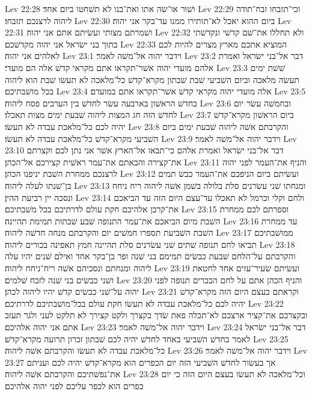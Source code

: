 Lev 22:28  ושׁור או־שׂה אתו ואת־בנו לא תשׁחטו ביום אחד׃
Lev 22:29  וכי־תזבחו זבח־תודה ליהוה לרצנכם תזבחו׃
Lev 22:30  ביום ההוא יאכל לא־תותירו ממנו עד־בקר אני יהוה׃
Lev 22:31  ושׁמרתם מצותי ועשׂיתם אתם אני יהוה׃
Lev 22:32  ולא תחללו את־שׁם קדשׁי ונקדשׁתי בתוך בני ישׂראל אני יהוה מקדשׁכם׃
Lev 22:33  המוציא אתכם מארץ מצרים להיות לכם לאלהים אני יהוה׃
Lev 23:1  וידבר יהוה אל־משׁה לאמר׃
Lev 23:2  דבר אל־בני ישׂראל ואמרת אלהם מועדי יהוה אשׁר־תקראו אתם מקראי קדשׁ אלה הם מועדי׃
Lev 23:3  שׁשׁת ימים תעשׂה מלאכה וביום השׁביעי שׁבת שׁבתון מקרא־קדשׁ כל־מלאכה לא תעשׂו שׁבת הוא ליהוה בכל מושׁבתיכם׃
Lev 23:4  אלה מועדי יהוה מקראי קדשׁ אשׁר־תקראו אתם במועדם׃
Lev 23:5  בחדשׁ הראשׁון בארבעה עשׂר לחדשׁ בין הערבים פסח ליהוה׃
Lev 23:6  ובחמשׁה עשׂר יום לחדשׁ הזה חג המצות ליהוה שׁבעת ימים מצות תאכלו׃
Lev 23:7  ביום הראשׁון מקרא־קדשׁ יהיה לכם כל־מלאכת עבדה לא תעשׂו׃
Lev 23:8  והקרבתם אשׁה ליהוה שׁבעת ימים ביום השׁביעי מקרא־קדשׁ כל־מלאכת עבדה לא תעשׂו׃
Lev 23:9  וידבר יהוה אל־משׁה לאמר׃
Lev 23:10  דבר אל־בני ישׂראל ואמרת אלהם כי־תבאו אל־הארץ אשׁר אני נתן לכם וקצרתם את־קצירה והבאתם את־עמר ראשׁית קצירכם אל־הכהן׃
Lev 23:11  והניף את־העמר לפני יהוה לרצנכם ממחרת השׁבת יניפנו הכהן׃
Lev 23:12  ועשׂיתם ביום הניפכם את־העמר כבשׂ תמים בן־שׁנתו לעלה ליהוה׃
Lev 23:13  ומנחתו שׁני עשׂרנים סלת בלולה בשׁמן אשׁה ליהוה ריח ניחח ונסכה יין רביעת ההין׃
Lev 23:14  ולחם וקלי וכרמל לא תאכלו עד־עצם היום הזה עד הביאכם את־קרבן אלהיכם חקת עולם לדרתיכם בכל משׁבתיכם׃
Lev 23:15  וספרתם לכם ממחרת השׁבת מיום הביאכם את־עמר התנופה שׁבע שׁבתות תמימת תהיינה׃
Lev 23:16  עד ממחרת השׁבת השׁביעת תספרו חמשׁים יום והקרבתם מנחה חדשׁה ליהוה׃
Lev 23:17  ממושׁבתיכם תביאו לחם תנופה שׁתים שׁני עשׂרנים סלת תהיינה חמץ תאפינה בכורים ליהוה׃
Lev 23:18  והקרבתם על־הלחם שׁבעת כבשׂים תמימם בני שׁנה ופר בן־בקר אחד ואילם שׁנים יהיו עלה ליהוה ומנחתם ונסכיהם אשׁה ריח־ניחח ליהוה׃
Lev 23:19  ועשׂיתם שׂעיר־עזים אחד לחטאת ושׁני כבשׂים בני שׁנה לזבח שׁלמים׃
Lev 23:20  והניף הכהן אתם על לחם הבכרים תנופה לפני יהוה על־שׁני כבשׂים קדשׁ יהיו ליהוה לכהן׃
Lev 23:21  וקראתם בעצם היום הזה מקרא־קדשׁ יהיה לכם כל־מלאכת עבדה לא תעשׂו חקת עולם בכל־מושׁבתיכם לדרתיכם׃
Lev 23:22  ובקצרכם את־קציר ארצכם לא־תכלה פאת שׂדך בקצרך ולקט קצירך לא תלקט לעני ולגר תעזב אתם אני יהוה אלהיכם׃
Lev 23:23  וידבר יהוה אל־משׁה לאמר׃
Lev 23:24  דבר אל־בני ישׂראל לאמר בחדשׁ השׁביעי באחד לחדשׁ יהיה לכם שׁבתון זכרון תרועה מקרא־קדשׁ׃
Lev 23:25  כל־מלאכת עבדה לא תעשׂו והקרבתם אשׁה ליהוה׃
Lev 23:26  וידבר יהוה אל־משׁה לאמר׃
Lev 23:27  אך בעשׂור לחדשׁ השׁביעי הזה יום הכפרים הוא מקרא־קדשׁ יהיה לכם ועניתם את־נפשׁתיכם והקרבתם אשׁה ליהוה׃
Lev 23:28  וכל־מלאכה לא תעשׂו בעצם היום הזה כי יום כפרים הוא לכפר עליכם לפני יהוה אלהיכם׃
